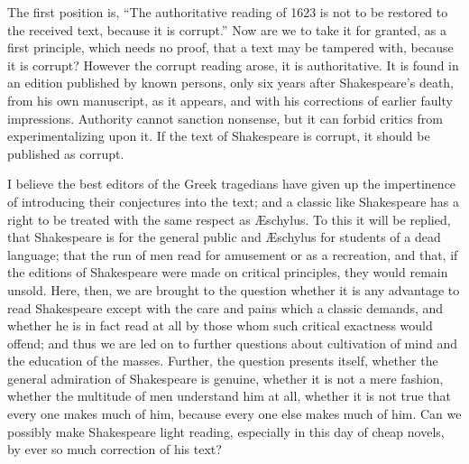 The first position is, ``The authoritative reading of 1623 is
not to be restored to the received text, because it is corrupt.''
Now are we to take it for granted, as a first principle, which needs
no proof, that a text may be tampered with, because it is corrupt?
However the corrupt reading arose, it is authoritative. It is found in
an edition published by known persons, only six years after
Shakespeare's death, from his own manuscript, as it appears, and with
his corrections of earlier faulty impressions. Authority cannot
sanction nonsense, but it can forbid critics from experimentalizing
upon it. If the text of Shakespeare is corrupt, it should be published
as corrupt.

I believe the best editors of the Greek tragedians have given up
the impertinence of introducing their conjectures into the text; and a
classic like Shakespeare has a right to be treated with the same
respect as Æschylus. To this it will be replied, that Shakespeare is
for the general public and Æschylus for students of a dead language;
that the run of men read for amusement or as a recreation, and that,
if the editions of Shakespeare were made on critical principles, they
would remain unsold. Here, then, we are brought to the question
whether it is any advantage to read Shakespeare except with the care
and pains which a classic demands, and whether he is in fact read at
all by those whom such critical exactness would offend; and thus we
are led on to further questions about cultivation of mind and the
education of the masses. Further, the question presents itself,
whether the general admiration of Shakespeare is genuine, whether it
is not a mere fashion, whether the multitude of men understand him at
all, whether it is not true that every one makes much of him, because
every one else makes much of him. Can we possibly make Shakespeare
light reading, especially in this day of cheap novels, by ever so much
correction of his text?

